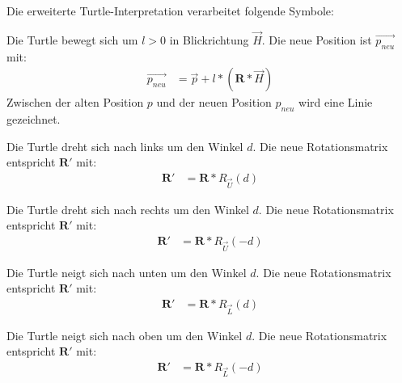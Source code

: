 Die erweiterte Turtle-Interpretation verarbeitet folgende Symbole:

\begin{description}[labelindent]
	\item[\boldmath$F(l)$]  Die Turtle bewegt sich um $l>0$ in Blickrichtung $\overrightarrow{H}$. Die neue Position ist $\overrightarrow{p_{neu}}$ mit:
	\begin{equation}
	\begin{array}{ll}
	\overrightarrow{p_{neu}} & = \overrightarrow{p} + l * (\boldsymbol{R} * \overrightarrow{H})
	\end{array}
	\label{eq:Turtle3D_F}
	\end{equation} 
	Zwischen der alten Position $p$ und der neuen Position $p_{neu}$ wird eine Linie gezeichnet. \\
	
	\item[\boldmath$+(d)$]  Die Turtle dreht sich nach links um den Winkel $d$. Die neue Rotationsmatrix entspricht $\boldsymbol{R'}$ mit:\\
	\begin{equation}
	\begin{array}{ll}
	\boldsymbol{R'} & =  \boldsymbol{R} * R_{\overrightarrow{U}}(d)
	\end{array}
	\end{equation} 
	
	\item[\boldmath$-(d)$]  Die Turtle dreht sich nach rechts um den Winkel $d$. Die neue Rotationsmatrix entspricht $\boldsymbol{R'}$ mit:\\
	\begin{equation}
	\begin{array}{ll}
	\boldsymbol{R'} & =  \boldsymbol{R} * R_{\overrightarrow{U}}(-d)
	\end{array}
	\end{equation} 
	
	\item[\boldmath$\&(d)$]  Die Turtle neigt sich nach unten um den Winkel $d$. Die neue Rotationsmatrix entspricht $\boldsymbol{R'}$ mit:\\
	\begin{equation}
	\begin{array}{ll}
	\boldsymbol{R'} & =  \boldsymbol{R} * R_{\overrightarrow{L}}(d)
	\end{array}
	\end{equation}
	
	\item[\boldmath$^\wedge (d)$]  Die Turtle neigt sich nach oben um den Winkel $d$. Die neue Rotationsmatrix entspricht $\boldsymbol{R'}$ mit:\\
	\begin{equation}
	\begin{array}{ll}
	\boldsymbol{R'} & =  \boldsymbol{R} * R_{\overrightarrow{L}}(-d)
	\end{array}
	\end{equation}
	

\end{description}
